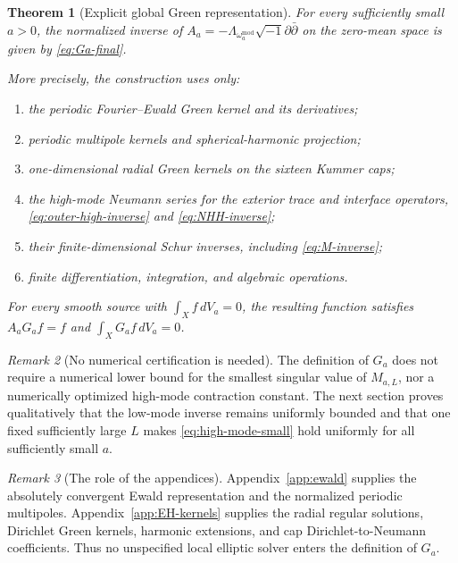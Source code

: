 \documentclass[11pt,a4paper,twoside]{article}
\numberwithin{equation}{section}
\newcommand{\ddc}{\sqrt{-1}\partial\bar\partial}
\newtheorem{theorem}{Theorem}[section]
\theoremstyle{definition}
\theoremstyle{remark}
\newtheorem{remark}[theorem]{Remark}
\begin{document}
\begin{theorem}[Explicit global Green representation]
\label{thm:explicit-global-green}
For every sufficiently small \(a>0\), the normalized inverse of \(A_a = -\Lambda_{\omega_a^{\mathrm{mod}}}\ddc\) on the zero-mean space is given by
\eqref{eq:Ga-final}.

More precisely, the construction uses only:

\begin{enumerate}
\item
the periodic Fourier--Ewald Green kernel and its derivatives;

\item
periodic multipole kernels and spherical-harmonic projection;

\item
one-dimensional radial Green kernels on the sixteen Kummer caps;

\item
the high-mode Neumann series for the exterior trace and interface
operators, \eqref{eq:outer-high-inverse} and \eqref{eq:NHH-inverse};

\item
their finite-dimensional Schur inverses, including
\eqref{eq:M-inverse};

\item
finite differentiation, integration, and algebraic operations.
\end{enumerate}

For every smooth source with \(\int_Xf\,dV_a=0\), the resulting
function satisfies \(A_aG_af=f\) and \(\int_XG_af\,dV_a=0\).
\end{theorem}

\begin{remark}[No numerical certification is needed]
\label{rem:no-numerical-Green}
The definition of \(G_a\) does not require a numerical lower bound for
the smallest singular value of \(M_{a,L}\), nor a numerically optimized
high-mode contraction constant.  The next section proves
qualitatively that the low-mode inverse remains uniformly bounded and
that one fixed sufficiently large \(L\) makes
\eqref{eq:high-mode-small} hold uniformly for all sufficiently small
\(a\).
\end{remark}

\begin{remark}[The role of the appendices]
\label{rem:Green-appendices}
Appendix~\ref{app:ewald} supplies the absolutely convergent Ewald
representation and the normalized periodic multipoles.
Appendix~\ref{app:EH-kernels} supplies the radial regular solutions,
Dirichlet Green kernels, harmonic extensions, and cap
Dirichlet-to-Neumann coefficients.  Thus no unspecified local elliptic
solver enters the definition of \(G_a\).
\end{remark}
\end{document}
